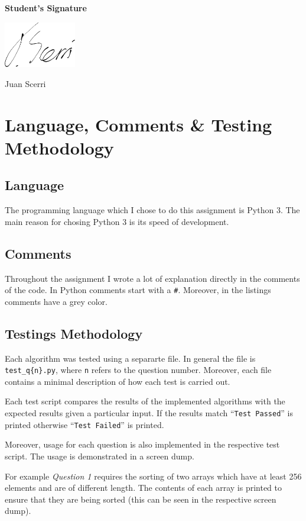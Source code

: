 \documentclass[12pt]{article}
\begin{document}
\textbf{Student's Signature} \medskip

\underline{\includegraphics[height=2cm]{sig}} \medskip

Juan Scerri

\section{Language, Comments \& Testing Methodology}

\subsection{Language}

The programming language which I chose to do this assignment is
Python 3. The main reason for chosing Python 3 is its speed of
development.

\subsection{Comments}

Throughout the assignment I wrote a lot of explanation directly in
the comments of the code. In Python comments start with a
\texttt{\#}. Moreover, in the listings comments have a grey
color.

\subsection{Testings Methodology}

Each algorithm was tested using a separarte file. In general the
file is \texttt{test\_q\{n\}.py}, where \texttt{n} refers to the
question number. Moreover, each file contains a minimal
description of how each test is carried out.

Each test script compares the results of the implemented
algorithms with the expected results given a particular input.
If the results match ``\texttt{Test Passed}'' is printed
otherwise ``\texttt{Test Failed}'' is printed. 

Moreover, usage for each question is also implemented in the
respective test script. The usage is demonstrated in a screen
dump.

For example \textit{Question 1} requires the sorting of two
arrays which have at least 256 elements and are of different
length. The contents of each array is printed to ensure that
they are being sorted (this can be seen in the respective screen
dump).
\end{document}
